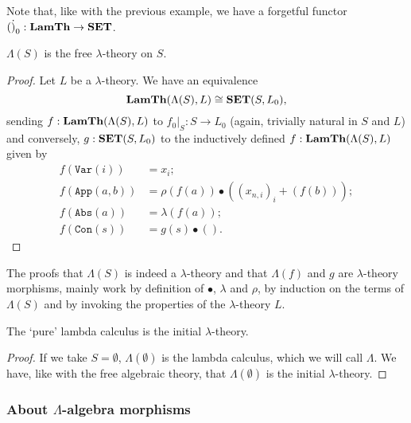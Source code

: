 Note that, like with the previous example, we have a forgetful functor $ (\dot)_0: \mathbf{LamTh} \to \mathbf{SET} $.

\begin{lemma}
  $ \Lambda(S) $ is the free $ \lambda $-theory on $ S $.
\end{lemma}
\begin{proof}
  Let $ L $ be a $ \lambda $-theory. We have an equivalence
  \[ \mathbf{LamTh}(\Lambda(S), L) \cong \mathbf{SET}(S, L_0), \]
  sending $ f: \mathbf{LamTh}(\Lambda(S), L) $ to $ f_0 \vert_S: S \to L_0 $ (again, trivially natural in $ S $ and $ L $) and conversely, $ g: \mathbf{SET}(S, L_0) $ to the inductively defined $ f: \mathbf{LamTh}(\Lambda(S), L) $ given by
  \begin{align*}
    f(\mathtt{Var}(i)) &= x_i;\\
    f(\mathtt{App}(a, b)) &= \rho(f(a)) \bullet ((x_{n, i})_i + (f(b)));\\
    f(\mathtt{Abs}(a)) &= \lambda(f(a));\\
    f(\mathtt{Con}(s)) &= g(s) \bullet ().
  \end{align*}
\end{proof}

The proofs that $ \Lambda(S) $ is indeed a $ \lambda $-theory and that $ \Lambda(f) $ and $ g $ are $ \lambda $-theory morphisms, mainly work by definition of $ \bullet $, $ \lambda $ and $ \rho $, by induction on the terms of $ \Lambda(S) $ and by invoking the properties of the $ \lambda $-theory $ L $.

\begin{corollary}
  The `pure' lambda calculus is the initial $ \lambda $-theory.
\end{corollary}
\begin{proof}
  If we take $ S = \emptyset $, $ \Lambda(\emptyset) $ is the lambda calculus, which we will call $ \Lambda $. We have, like with the free algebraic theory, that $ \Lambda(\emptyset) $ is the initial $ \lambda $-theory.
\end{proof}

\subsubsection{About $ \Lambda $-algebra morphisms}

